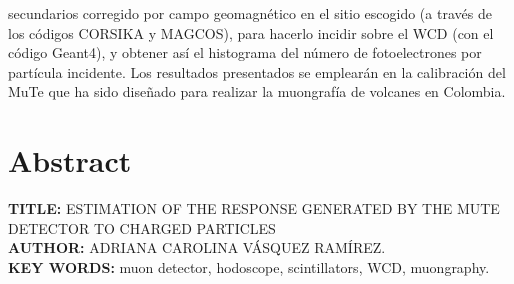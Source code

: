 \documentclass[12pt,oneside,openany,letter]{book}
\begin{document}
{secundarios corregido por campo geomagnético en el sitio escogido (a trav\'es de los c\'odigos CORSIKA y MAGCOS), para hacerlo incidir sobre el WCD (con el c\'odigo Geant4), y obtener as\'i el histograma del n\'umero de fotoelectrones por part\'icula incidente. Los resultados presentados se emplearán en la calibración del MuTe que ha sido diseñado para realizar la muongrafía de volcanes en Colombia.}

\chapter*{Abstract}

{\footnotesize \textbf{TITLE:} ESTIMATION OF THE RESPONSE GENERATED BY THE MUTE DETECTOR TO CHARGED PARTICLES\\
\textbf{AUTHOR:} ADRIANA CAROLINA V\'ASQUEZ RAM\'IREZ.\\
\textbf{KEY WORDS:} muon detector, hodoscope, scintillators, WCD, muongraphy.\\

}
\end{document}
